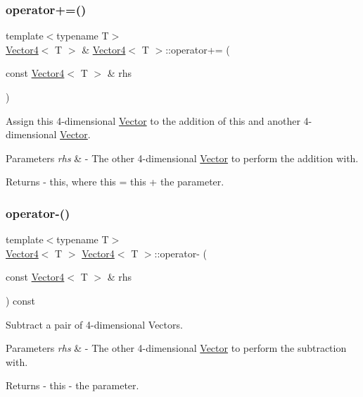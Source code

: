 \subsubsection{\texorpdfstring{operator+=()}{operator+=()}}
{\footnotesize\ttfamily template$<$typename T$>$ \\
\mbox{\hyperlink{class_vector4}{Vector4}}$<$ T $>$ \& \mbox{\hyperlink{class_vector4}{Vector4}}$<$ T $>$\+::operator+= (\begin{DoxyParamCaption}\item[{const \mbox{\hyperlink{class_vector4}{Vector4}}$<$ T $>$ \&}]{rhs }\end{DoxyParamCaption})}

Assign this 4-\/dimensional \mbox{\hyperlink{class_vector}{Vector}} to the addition of this and another 4-\/dimensional \mbox{\hyperlink{class_vector}{Vector}}. 
\begin{DoxyParams}{Parameters}
{\em rhs} & -\/ The other 4-\/dimensional \mbox{\hyperlink{class_vector}{Vector}} to perform the addition with. \\
\hline
\end{DoxyParams}
\begin{DoxyReturn}{Returns}
-\/ this, where \textquotesingle{}this = this + the parameter\textquotesingle{}. 
\end{DoxyReturn}
\mbox{\label{class_vector4_a41cb957697e0e937e0f7f4a5d459575a}} 
\subsubsection{\texorpdfstring{operator-\/()}{operator-()}}
{\footnotesize\ttfamily template$<$typename T$>$ \\
\mbox{\hyperlink{class_vector4}{Vector4}}$<$ T $>$ \mbox{\hyperlink{class_vector4}{Vector4}}$<$ T $>$\+::operator-\/ (\begin{DoxyParamCaption}\item[{const \mbox{\hyperlink{class_vector4}{Vector4}}$<$ T $>$ \&}]{rhs }\end{DoxyParamCaption}) const}

Subtract a pair of 4-\/dimensional Vectors. 
\begin{DoxyParams}{Parameters}
{\em rhs} & -\/ The other 4-\/dimensional \mbox{\hyperlink{class_vector}{Vector}} to perform the subtraction with. \\
\hline
\end{DoxyParams}
\begin{DoxyReturn}{Returns}
-\/ this -\/ the parameter. 
\end{DoxyReturn}
\mbox{\label{class_vector4_a14caed9a7066f773974ab3bc5fb5e483}} 
